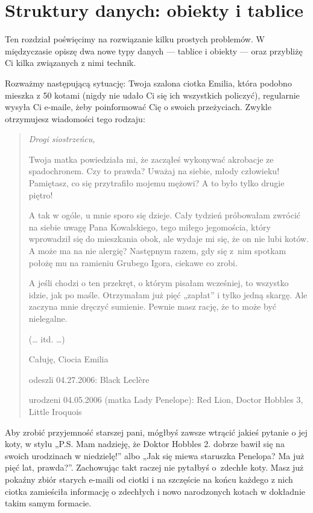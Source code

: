 \chapter{Struktury danych: obiekty i tablice}
\label{chap:4}
  
    
Ten rozdział poświęcimy na rozwiązanie kilku prostych problemów. W międzyczasie opiszę dwa nowe typy danych — tablice i obiekty — oraz przybliżę Ci kilka związanych z nimi technik.

    
Rozważmy następującą sytuację: Twoja szalona ciotka Emilia, która podobno mieszka z 50 kotami (nigdy nie udało Ci się ich wszystkich policzyć), regularnie wysyła Ci e-maile, żeby poinformować Cię o swoich przeżyciach. Zwykle otrzymujesz wiadomości tego rodzaju:

    
\begin{quotation}
\itshape
Drogi siostrzeńcu,

\smallskip  

Twoja matka powiedziała mi, że zacząłeś wykonywać akrobacje ze spadochronem. Czy to prawda? Uważaj na siebie, młody człowieku! Pamiętasz, co się przytrafiło mojemu mężowi? A to było tylko drugie piętro!
      
A tak w ogóle, u mnie sporo się dzieje. Cały tydzień próbowałam zwrócić na siebie uwagę Pana Kowalskiego, tego miłego jegomościa, który wprowadził się do mieszkania obok, ale wydaje mi się, że on nie lubi kotów. A może ma na nie alergię? Następnym razem, gdy się z~nim spotkam położę mu na ramieniu Grubego Igora, ciekawe co zrobi.
      
A jeśli chodzi o ten przekręt, o którym pisałam wcześniej, to wszystko idzie, jak po maśle. Otrzymałam już pięć „zapłat” i tylko jedną skargę. Ale zaczyna mnie dręczyć sumienie. Pewnie masz rację, że to może być nielegalne.
      
(… itd. …)

\smallskip      

Całuję, Ciocia Emilia

\smallskip
      
odeszli 04.27.2006: Black Leclère
      
urodzeni 04.05.2006 (matka Lady Penelope): Red Lion, Doctor Hobbles 3, Little Iroquois
\end{quotation}
    
Aby zrobić przyjemność starszej pani, mógłbyś zawsze wtrącić jakieś pytanie o jej koty, w stylu „P.S. Mam nadzieję, że Doktor Hobbles 2. dobrze bawił się na swoich urodzinach w niedzielę!” albo „Jak się miewa staruszka Penelopa? Ma już pięć lat, prawda?”. Zachowując takt raczej nie pytałbyś o~zdechłe koty. Masz już pokaźny zbiór starych e-maili od ciotki i na szczęście na końcu każdego z nich ciotka zamieściła informację o zdechłych i nowo narodzonych kotach w dokładnie takim samym formacie.

